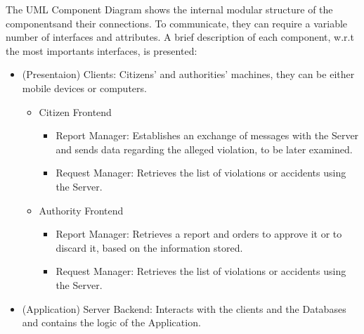     The UML Component Diagram shows the internal modular structure of the componentsand their connections. 
    To communicate, they can require a variable number of interfaces and attributes. 
    A brief description of each component, w.r.t the most importants interfaces, is presented:

    \begin{itemize}

        \item (Presentaion) Clients: Citizens' and authorities' machines, they can be either mobile devices or computers.
        
        \begin{itemize}

            \item Citizen Frontend

            \begin{itemize}

                \item Report Manager: Establishes an exchange of messages with the Server and sends data regarding the alleged violation, to be later examined.
                
                \item Request Manager: Retrieves the list of violations or accidents using the Server.
                
            \end{itemize}

            \item Authority Frontend

            \begin{itemize}

                \item Report Manager: Retrieves a report and orders to approve it or to discard it, based on the information stored.
                
                \item Request Manager: Retrieves the list of violations or accidents using the Server.
                
            \end{itemize}
            
        \end{itemize}

        \item (Application) Server Backend: Interacts with the clients and the Databases and contains the logic of the Application.
        

\end{itemize}
